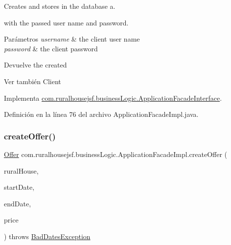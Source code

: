 Creates and stores in the database a. 


\begin{DoxyCode}{0}
\end{DoxyCode}
 with the passed user name and password.


\begin{DoxyParams}{Parámetros}
{\em username} & the client user name \\
\hline
{\em password} & the client password\\
\hline
\end{DoxyParams}
\begin{DoxyReturn}{Devuelve}
the created
\begin{DoxyCode}{0}
\end{DoxyCode}

\end{DoxyReturn}
\begin{DoxySeeAlso}{Ver también}
Client 
\end{DoxySeeAlso}


Implementa \mbox{\hyperlink{interfacecom_1_1ruralhousejsf_1_1business_logic_1_1_application_facade_interface_acb939a4c57b1136e2e8d1c7b661c10af}{com.\+ruralhousejsf.\+business\+Logic.\+Application\+Facade\+Interface}}.



Definición en la línea 76 del archivo Application\+Facade\+Impl.\+java.

\mbox{\label{classcom_1_1ruralhousejsf_1_1business_logic_1_1_application_facade_impl_acbf81cc6dc4bf9adf9ea7a85751edfc0}} 
\subsubsection{\texorpdfstring{createOffer()}{createOffer()}\hspace{0.1cm}{\footnotesize\ttfamily [1/2]}}
{\footnotesize\ttfamily \mbox{\hyperlink{classcom_1_1ruralhousejsf_1_1domain_1_1_offer}{Offer}} com.\+ruralhousejsf.\+business\+Logic.\+Application\+Facade\+Impl.\+create\+Offer (\begin{DoxyParamCaption}\item[{\mbox{\hyperlink{classcom_1_1ruralhousejsf_1_1domain_1_1_rural_house}{Rural\+House}}}]{rural\+House,  }\item[{Local\+Date}]{start\+Date,  }\item[{Local\+Date}]{end\+Date,  }\item[{double}]{price }\end{DoxyParamCaption}) throws \mbox{\hyperlink{classcom_1_1ruralhousejsf_1_1exceptions_1_1_bad_dates_exception}{Bad\+Dates\+Exception}}}



